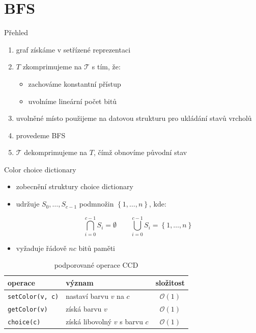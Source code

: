 \documentclass[czech]{beamer}
\begin{document}
	\section{BFS}
	\begin{frame}{Přehled}
		\begin{enumerate}
			\item graf získáme v setřízené reprezentaci
			\item $T$ zkomprimujeme na $\mathcal{T}$ s tím, že:
			\begin{itemize}
				\item zachováme konstantní přístup
				\item uvolníme lineární počet bitů
			\end{itemize}
			\item uvolněné místo použijeme na datovou strukturu pro ukládání stavů vrcholů
			\item provedeme BFS
			\item $\mathcal{T}$ dekomprimujeme na $T$, čímž obnovíme původní stav
		\end{enumerate}
	\end{frame}

	\begin{frame}{Color choice dictionary}
		\begin{itemize}
			\item zobecnění struktury choice dictionary
			\item udržuje $S_0, \ldots, S_{c - 1}$ podmnožin $\left\{1, \ldots, n\right\}$, kde:

				$$\bigcap_{i=0}^{c-1} S_i = \emptyset \qquad\bigcup_{i=0}^{c-1} S_i = \left\{1, \ldots, n\right\}$$

			\item vyžaduje řádově $nc$ bitů paměti
		\end{itemize}

		\vfill

		\begin{table}
			\centering
			\begin{tabular}{llc}
				\toprule
				operace & význam & složitost \\
				\midrule
				\texttt{setColor(v, c)} & nastaví barvu $v$ na $c$        & $\mathcal{O}\left(1\right)$ \\
				\texttt{getColor(v)}    & získá barvu $v$                 & $\mathcal{O}\left(1\right)$ \\
				\texttt{choice(c)}      & získá libovolný $v$ s barvu $c$ & $\mathcal{O}\left(1\right)$ \\
				\bottomrule
			\end{tabular}
			\caption{podporované operace CCD}
		\end{table}
	\end{frame}
\end{document}
